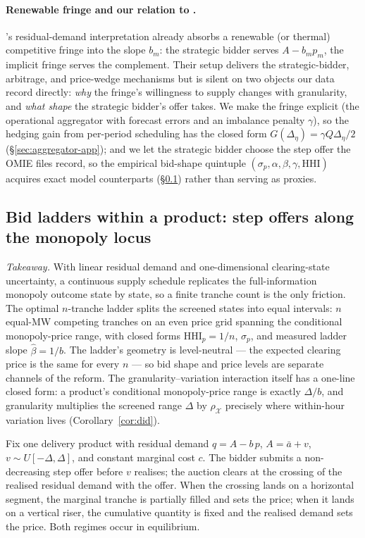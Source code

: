 \documentclass[11pt,a4paper]{article}
\theoremstyle{definition}
\theoremstyle{remark}
\theoremstyle{plain}
\begin{document}
\paragraph{Renewable fringe and our relation to \citeauthor{ito_reguant_2016}.} \citeauthor{ito_reguant_2016}'s residual-demand interpretation already absorbs a renewable (or thermal) competitive fringe into the slope $b_m$: the strategic bidder serves $A - b_m p_m$, the implicit fringe serves the complement. Their setup delivers the strategic-bidder, arbitrage, and price-wedge mechanisms but is silent on two objects our data record directly: \emph{why} the fringe's willingness to supply changes with granularity, and \emph{what shape} the strategic bidder's offer takes. We make the fringe explicit (the operational aggregator with forecast errors and an imbalance penalty $\gamma$), so the hedging gain from per-period scheduling has the closed form $G(\Delta_\eta) = \gamma Q \Delta_\eta/2$ (\S\ref{sec:aggregator-app}); and we let the strategic bidder choose the step offer the OMIE files record, so the empirical bid-shape quintuple $(\sigma_p, \alpha, \beta, \gamma, \text{HHI})$ acquires exact model counterparts (\S\ref{sec:ladder}) rather than serving as proxies.

\subsection{Bid ladders within a product: step offers along the monopoly locus}\label{sec:ladder}

\emph{Takeaway.} With linear residual demand and one-dimensional clearing-state uncertainty, a continuous supply schedule replicates the full-information monopoly outcome state by state, so a finite tranche count is the only friction. The optimal $n$-tranche ladder splits the screened states into equal intervals: $n$ equal-MW competing tranches on an even price grid spanning the conditional monopoly-price range, with closed forms $\text{HHI}_p = 1/n$, $\sigma_p$, and measured ladder slope $\hat\beta = 1/b$. The ladder's geometry is level-neutral --- the expected clearing price is the same for every $n$ --- so bid shape and price levels are separate channels of the reform. The granularity--variation interaction itself has a one-line closed form: a product's conditional monopoly-price range is exactly $\Delta/b$, and granularity multiplies the screened range $\Delta$ by $\rho_{\mathcal X}$ precisely where within-hour variation lives (Corollary~\ref{cor:did}).

Fix one delivery product with residual demand $q = A - b\,p$, $A = \bar a + v$, $v \sim U[-\Delta, \Delta]$, and constant marginal cost $c$. The bidder submits a non-decreasing step offer before $v$ realises; the auction clears at the crossing of the realised residual demand with the offer. When the crossing lands on a horizontal segment, the marginal tranche is partially filled and sets the price; when it lands on a vertical riser, the cumulative quantity is fixed and the realised demand sets the price. Both regimes occur in equilibrium.
\end{document}
